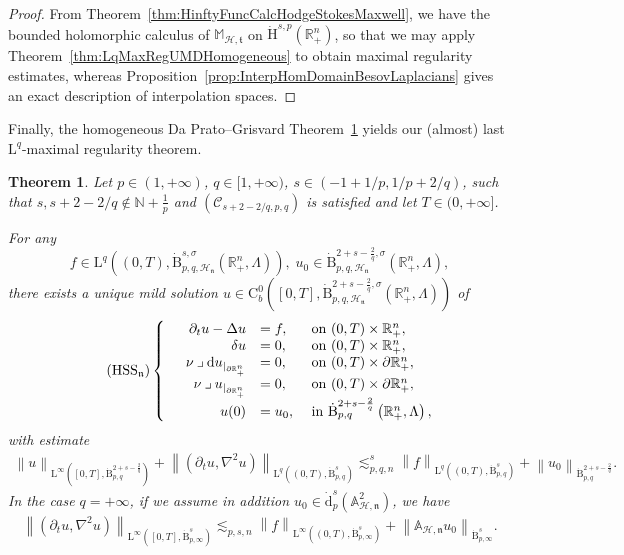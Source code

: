 \documentclass[10pt]{amsart}
\newtheorem{theo}{Theorem}[section]
\theoremstyle{definition}\newtheorem{defi}[theo]{Definition}\newtheorem{rema}[theo]{Remark}\newtheorem{exam}[theo]{Example}\newtheorem{exem}[theo]{Example}\newtheorem{nota}[theo]{Notation}
\newcommand{\bbA}{\mathbb{A}}
\newcommand{\bbR}{\mathbb{R}}
\newcommand{\bbN}{\mathbb{N}}
\newcommand{\bbM}{\mathbb{M}}
\newcommand{\rmH}{\mathrm{H}}%
\newcommand{\rmB}{\mathrm{B}}
\newcommand{\rmd}{\mathrm{d}}
\newcommand{\rmL}{\mathrm{L}}
\newcommand{\rmC}{\mathrm{C}}
\newcommand{\clH}{\mathcal{H}}
\newcommand{\clC}{\mathcal{C}}
\newcommand{\fkn}{\mathfrak{n}}
\newcommand{\fkt}{\mathfrak{t}}
\newcommand{\iprod}{\mathbin{\lrcorner}}
\begin{document}
\begin{proof}
From Theorem~\ref{thm:HinftyFuncCalcHodgeStokesMaxwell}, we have the bounded holomorphic calculus of $\bbM_\mathcal{H,\fkt}$ on $\dot{\rmH}^{s,p}(\bbR^n_+)$, so that we may apply Theorem~\ref{thm:LqMaxRegUMDHomogeneous} to obtain maximal regularity estimates, whereas Proposition~\ref{prop:InterpHomDomainBesovLaplacians} gives an exact description of interpolation spaces.
\end{proof}

Finally, the homogeneous Da Prato--Grisvard Theorem~\ref{thm:MaxRxBesovHodgeStokesRn+} yields our (almost) last $\rmL^q$-maximal regularity theorem.

\begin{theo}\label{thm:MaxRxBesovHodgeStokesRn+}
Let $p\in(1,+\infty)$, $q\in[1,+\infty)$, $s\in(-1+1/p,1/p+2/q)$, such that $s,s+2-2/q\notin \bbN +\frac{1}{p}$ and $(\clC_{s+2-2/q,p,q})$ is satisfied and let $T\in(0,+\infty]$.

For any 
\[
f\in \rmL^q\left((0,T),\dot{\rmB}^{s,\sigma}_{p,q,\mathcal{\clH_{\fkn}}}\left(\bbR^n_+,\Lambda\right)\right), \; u_0\in \dot{\rmB}^{2+s-\frac{2}{q},\sigma}_{p,q,\clH_\fkn}\left(\bbR^n_+,\Lambda\right),
\]
there exists a unique mild solution $u \in \rmC ^0_b([0,T],\dot{\rmB}^{2+s-\frac{2}{q},\sigma}_{p,q,\clH_\fkn}(\bbR^n_+,\Lambda))$ of
\begin{equation}
\tag{HSS${}_{\fkn}$}\label{eq:HodgeStokesAbsoluteBCSystem}
\left\{
\begin{array}{rrll}
&{\partial_t u - \Delta u}  &{= f,} &{\text{ on } (0,T)\times\bbR^n_+,}\\
&{\delta u} &{=  0,} &{\text{ on } (0,T)\times\bbR^n_+,}\\
&{\nu\iprod\rmd u_{|_{\partial\bbR^n_+}}} &{=  0,}
&{\text{ on } (0,T)\times\partial\bbR^n_+,}\\
&{\nu\iprod u_{|_{\partial\bbR^n_+}}} &{=  0,}
&{\text{ on } (0,T)\times\partial\bbR^n_+,}\\
&{u(0)} &{=  u_0,}
&{\text{ in } \dot{\rmB}^{2+s-\frac{2}{q}}_{p,q}\left(\bbR^n_+,\Lambda\right),}
\end{array}\right.
\end{equation}
with estimate
\begin{align*}
\left\| u \right\|_{\rmL^\infty([0,T],\dot{\rmB}^{2+s-\frac{2}{q}}_{p,q})} + 
\left\| \left(\partial_t u, \nabla^2 u\right) \right\|_{\rmL^q\left((0,T),\dot{\rmB}^{s}_{p,q}\right)} \lesssim_{p,q,n}^{s} \left\| f \right\|_{\rmL^q\left((0,T),\dot{\rmB}^{s}_{p,q}\right)} + \left\| u_0 \right\|_{\dot{\rmB}^{2+s-\frac{2}{q}}_{p,q}}.
\end{align*}
In the case $q=+\infty$, if we assume in addition $u_0\in \dot{\rmd}^{s}_{p}(\bbA_{\clH,\fkn}^2)$, we have
\begin{align*}
\left\| \left(\partial_t u, \nabla^2 u\right)\right\|_{\rmL^\infty\left([0,T],\dot{\rmB}^{s}_{p,\infty}\right)} \lesssim_{p,s,n} \left\| f \right\|_{\rmL^\infty\left((0,T),\dot{\rmB}^{s}_{p,\infty}\right)} + \left\| \bbA_{\clH,\fkn} u_0 \right\|_{\dot{\rmB}^{s}_{p,\infty}}.
\end{align*}
\end{theo}
\end{document}
